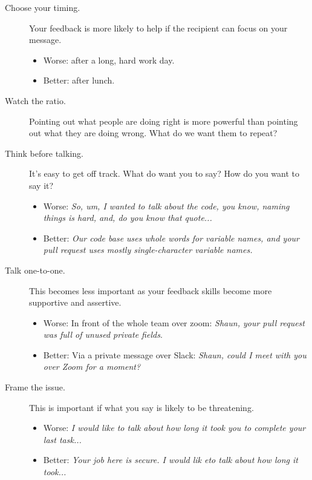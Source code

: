 \documentclass{article}
\begin{document}
\begin{tiny}
\begin{multicols}{3}
\begin{tcolorbox}
        \begin{description}
            \item[Choose your timing.] Your feedback is more likely to help if the recipient can focus on your message.
                \begin{itemize}
                    \item Worse: after a long, hard work day.
                    \item Better: after lunch.
                \end{itemize}
            \item[Watch the ratio.] Pointing out what people are doing right is more powerful than pointing out what they are doing wrong. What do we want them to repeat?
            \item[Think before talking.] It's easy to get off track. What do want you to say? How do you want to say it?
                \begin{itemize}
                    \item Worse: \emph{So, um, I wanted to talk about the code, you know, naming things is hard, and, do you know that quote...}                    
                    \item Better: \emph{Our code base uses whole words for variable names, and your pull request uses mostly single-character variable names.}
                \end{itemize}
            \item[Talk one-to-one.] This becomes less important as your feedback skills become more supportive and assertive.
                \begin{itemize}
                    \item Worse: In front of the whole team over zoom: \emph{Shaun, your pull request was full of unused private fields}.
                    \item Better: Via a private message over Slack: \emph{Shaun, could I meet with you over Zoom for a moment?}
                \end{itemize}
            \item[Frame the issue.] This is important if what you say is likely to be threatening.
                \begin{itemize}
                   \item Worse: \emph{I would like to talk about how long it took you to complete your last task... }
                   \item Better: \emph{Your job here is secure. I would lik eto talk about how long it took... }

\end{itemize}
\end{description}
\end{tcolorbox}
\end{multicols}
\end{tiny}
\end{document}
